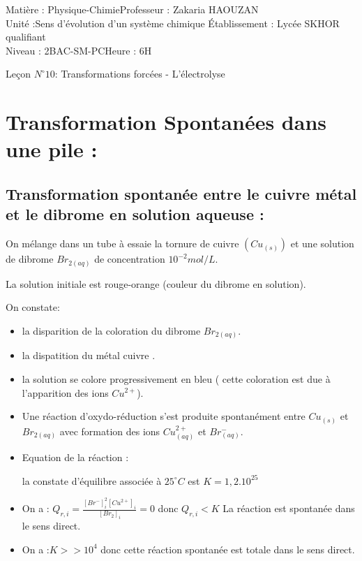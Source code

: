 \documentclass[12pt]{article}
\author{Zakaria HAOUZAN}
\date{\today}
\newcommand\headerMe[2]{\noindent{}#1\hfill#2}
\begin{document}
\headerMe{Matière : Physique-Chimie}{Professeur : Zakaria HAOUZAN}\\
\headerMe{Unité :Sens d'évolution d'un système chimique  }{Établissement : Lycée SKHOR qualifiant}\\
\headerMe{Niveau : 2BAC-SM-PC}{Heure : 6H}\\



\begin{center}

    \Large{Leçon $N^{\circ} 10 $: \color{red} Transformations forcées - L'électrolyse }
\end{center}
\section{Transformation Spontanées dans une pile :}
\subsection{Transformation spontanée entre le cuivre métal et le dibrome en solution aqueuse : }
On mélange dans un tube à essaie la tornure de cuivre $(Cu_{(s)})$ et une solution de dibrome $Br_{2(aq)}$ de concentration $10^{-2}mol/L$.

La solution initiale est rouge-orange (couleur du dibrome en solution).

On constate: 
\begin{itemize}
	\item la disparition de la coloration du dibrome $Br_{2(aq)}$.
	\item la dispatition du métal cuivre .
	\item la solution se colore progressivement en bleu ( cette coloration est due à l'apparition des ions $Cu^{2+}$).

	\item Une réaction d’oxydo-réduction s’est produite spontanément entre $Cu_{(s)}$ et $Br_{2(aq)}$ avec formation des ions $Cu^{2+}_{(aq)}$ et $Br^-_{(aq)}$.

	\item Equation de la réaction : 

		la constate d'équilibre associée à $25^\circ C$ est $K=1,2.10^{25}$

	\item On a : $Q_{r,i} = \frac{[Br^-]^2_i[Cu^{2+}]_i}{[Br_2]_i} = 0$ donc $Q_{r,i}<K$  La réaction est spontanée dans le sens direct.
	\item On a :$K>>10^4$ donc cette réaction spontanée est totale dans le sens direct.

\end{itemize}
\end{document}
